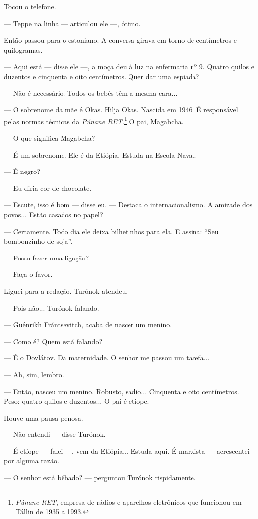 Tocou o telefone.

--- Teppe na linha --- articulou ele ---, ótimo.

Então passou para o estoniano. A conversa girava em torno de centímetros
e quilogramas.

--- Aqui está --- disse ele ---, a moça deu à luz na enfermaria nº 9.
Quatro quilos e duzentos e cinquenta e oito centímetros. Quer dar uma
espiada?

--- Não é necessário. Todos os bebês têm a mesma cara...

--- O sobrenome da mãe é Okas. Hilja Okas. Nascida em 1946. É
responsável pelas normas técnicas da \emph{Púnane RET}.\footnote{\emph{Púnane
  RET}, empresa de rádios e aparelhos eletrônicos que funcionou em
  Tállin de 1935 a 1993.} O pai, Magabcha.

--- O que significa Magabcha?

--- É um sobrenome. Ele é da Etiópia. Estuda na Escola Naval.

--- É negro?

--- Eu diria cor de chocolate.

--- Escute, isso é bom --- disse eu. --- Destaca o internacionalismo. A
amizade dos povos... Estão casados no papel?

--- Certamente. Todo dia ele deixa bilhetinhos para ela. E assina: ``Seu
bombonzinho de soja''.

--- Posso fazer uma ligação?

--- Faça o favor.

Liguei para a redação. Turónok atendeu.

--- Pois não... Turónok falando.

--- Guénrikh Frántsevitch, acaba de nascer um menino.

--- Como é? Quem está falando?

--- É o Dovlátov. Da maternidade. O senhor me passou um tarefa...

--- Ah, sim, lembro.

--- Então, nasceu um menino. Robusto, sadio... Cinquenta e oito
centímetros. Peso: quatro quilos e duzentos... O pai é etíope.

Houve uma pausa penosa.

--- Não entendi --- disse Turónok.

--- É etíope --- falei ---, vem da Etiópia... Estuda aqui. É marxista
--- acrescentei por alguma razão.

--- O senhor está bêbado? --- perguntou Turónok rispidamente.

